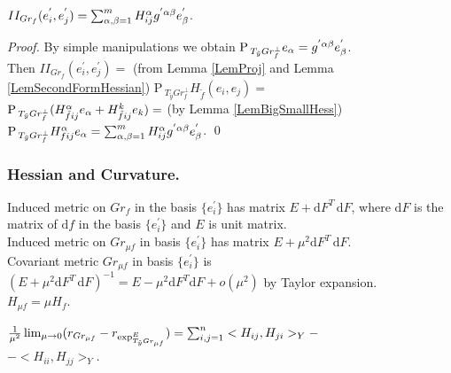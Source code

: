\documentclass{llncs}
\newcommand{\Proj}{\mathrm{P}{\,}}
\newcommand{\Diff}{\mathrm{d}}
\begin{document}
\begin{lemma} \label{LemSecondHessianFormula}
$II_{Gr_f}(e_i^{'}, e_j^{'})=\sum_{\alpha, \beta=1}^{m} \tensor*{H}{^{\alpha}_i_j} \tensor*{g}{^{'}^{\alpha}^{\beta}} e_{\beta}^{'}$.
\end{lemma}

\begin{proof}
By simple manipulations we obtain $\Proj_{T_{\tilde{y}}Gr_f^{\bot}}e_{\alpha} = \tensor*{g}{^{'}^{\alpha}^{\beta}} e_{\beta}^{'}$. 
\\
Then $II_{Gr_f}(e_i^{'}, e_j^{'}) =$ (from Lemma \ref{LemProj} and Lemma \ref{LemSecondFormHessian}) 
$\Proj_{T_{\tilde{y}}Gr_f^{\bot}} H_{\tilde{f}}(e_i, e_j) =$
\\
$\Proj_{T_{\tilde{y}}Gr_f^{\bot}} (\tensor*{H}{_{\tilde{f}}^{\alpha}_i_j} e_{\alpha} + \tensor*{H}{^{k}_{\tilde{f}}_i_j} e_{k}) 
=$ (by Lemma \ref{LemBigSmallHess}) $\Proj_{T_{\tilde{y}}Gr_f^{\bot}} \tensor*{H}{^{\alpha}_f_i_j}e_{\alpha} 
= \sum_{\alpha, \beta=1}^{m} \tensor*{H}{^{\alpha}_i_j} \tensor*{g}{^{'}^{\alpha}^{\beta}} e_{\beta}^{'}$.
\qed
\end{proof}

\subsubsection{Hessian and Curvature.}

\begin{proposition} \label{PropScaled}
Induced metric on $Gr_f$ in the basis $\{ e_i^{'} \}$ has matrix $E + \Diff F^{T} \, \Diff F$, 
where $\Diff F$ is the matrix of $\Diff f$ in the basis $\{ e_i^{'} \}$ and $E$ is unit matrix.
\\
Induced metric on $Gr_{\mu f}$ in basis $\{ e_i^{'} \}$ has matrix $E + \mu^{2} \Diff F^{T} \, \Diff F$.
\\
Covariant metric $Gr_{\mu f}$ in basis $\{ e_i^{'} \}$ is $(E + \mu^{2} \Diff F^{T} \, \Diff F)^{-1}
 = E - \mu^{2} \Diff F^{T} \Diff F + o(\mu ^ {2})$ by Taylor expansion.
\\
$H_{\mu f} = \mu H_f$.
\end{proposition}

\begin{lemma} \label{LemScalar}
$\frac{1}{{\mu}^2}\lim_{\mu\to 0} ( r_{Gr_{\mu f}} - r_{\tensor*{\exp}{^E_ {T_{\tilde{y}}Gr_{\mu f}} }} )
 = \sum_{i,j=1}^{n}<H_{ij},H_{ji}>_Y - $
\\$ - <H_{ii},H_{jj}>_Y$.
\end{lemma}
\end{document}
